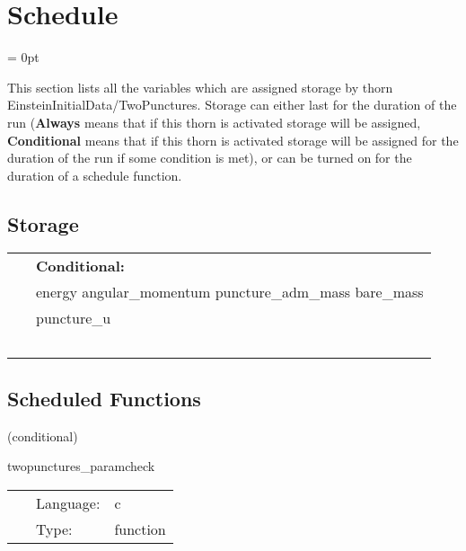 
\section{Schedule} 


\parskip = 0pt


\noindent This section lists all the variables which are assigned storage by thorn EinsteinInitialData/TwoPunctures.  Storage can either last for the duration of the run ({\bf Always} means that if this thorn is activated storage will be assigned, {\bf Conditional} means that if this thorn is activated storage will be assigned for the duration of the run if some condition is met), or can be turned on for the duration of a schedule function.


\subsection*{Storage}

\hspace{5mm}

 \begin{tabular*}{160mm}{ll} 
~& {\bf Conditional:} \\ 
~ &  energy angular\_momentum puncture\_adm\_mass bare\_mass\\ 
~ &  puncture\_u\\ 
~ & ~\\ 
\end{tabular*} 


\subsection*{Scheduled Functions}
\vspace{5mm}

   (conditional) 

\hspace{5mm} twopunctures\_paramcheck 

\hspace{5mm}{\it check parameters and thorn needs } 


\hspace{5mm}

 \begin{tabular*}{160mm}{cll} 
~ & Language:  & c \\ 
~ & Type:  & function \\ 
\end{tabular*} 


\vspace{5mm}

